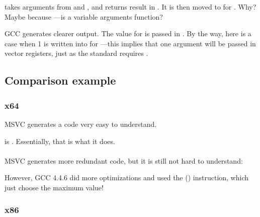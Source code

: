  takes arguments from  and , and returns result in .
It is then moved to \RDX for \printf. 
Why? 
Maybe because 
\printf{}---is a variable arguments function?



GCC generates clearer output. 
The value for \printf is passed in . 
By the way, here is a case when 1 is written into \EAX
for \printf ---this implies that one argument will be passed in vector registers,
just as the standard requires \SysVABI.

\subsection{Comparison example}



\subsubsection{x64}



\Optimizing MSVC generates a code very easy to understand.

 is . Essentially, that is what it does.\\
\\
\NonOptimizing MSVC generates more redundant code,
but it is still not hard to understand:



However, GCC 4.4.6 
did more optimizations and used the  () instruction,
which just choose the maximum value!



\clearpage
\subsubsection{x86}

